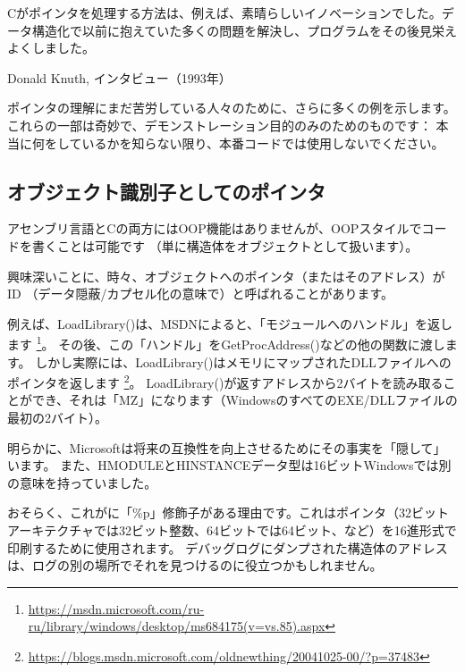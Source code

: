 \myindex{\CLanguageElements!\Pointers}
\label{label_pointers}

\epigraph{Cがポインタを処理する方法は、例えば、素晴らしいイノベーションでした。データ構造化で以前に抱えていた多くの問題を解決し、プログラムをその後見栄えよくしました。}{Donald Knuth, インタビュー（1993年）}

\CCpp{}ポインタの理解にまだ苦労している人々のために、さらに多くの例を示します。
これらの一部は奇妙で、デモンストレーション目的のみのためのものです：
本当に何をしているかを知らない限り、本番コードでは使用しないでください。








\subsection{オブジェクト識別子としてのポインタ}

アセンブリ言語とCの両方には\ac{OOP}機能はありませんが、\ac{OOP}スタイルでコードを書くことは可能です
（単に構造体をオブジェクトとして扱います）。

興味深いことに、時々、オブジェクトへのポインタ（またはそのアドレス）がID
（データ隠蔽/カプセル化の意味で）と呼ばれることがあります。

例えば、LoadLibrary()は、\ac{MSDN}によると、「モジュールへのハンドル」を返します
\footnote{\url{https://msdn.microsoft.com/ru-ru/library/windows/desktop/ms684175(v=vs.85).aspx}}。
その後、この「ハンドル」をGetProcAddress()などの他の関数に渡します。
しかし実際には、LoadLibrary()はメモリにマップされたDLLファイルへのポインタを返します
\footnote{\url{https://blogs.msdn.microsoft.com/oldnewthing/20041025-00/?p=37483}}。
LoadLibrary()が返すアドレスから2バイトを読み取ることができ、それは「MZ」になります（WindowsのすべてのEXE/DLLファイルの最初の2バイト）。

明らかに、Microsoftは将来の互換性を向上させるためにその事実を「隠して」います。
また、HMODULEとHINSTANCEデータ型は16ビットWindowsでは別の意味を持っていました。

おそらく、これが\printf{}に「\%p」修飾子がある理由です。これはポインタ（32ビットアーキテクチャでは32ビット整数、64ビットでは64ビット、など）を16進形式で印刷するために使用されます。
デバッグログにダンプされた構造体のアドレスは、ログの別の場所でそれを見つけるのに役立つかもしれません。

